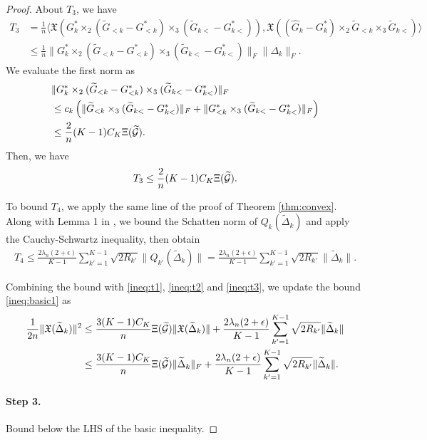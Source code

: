 \begin{proof}
About $T_3$, we have
\begin{align*}
	T_3 &=  \frac{1}{n} \langle  \mathfrak{X}(G_k^* \times_2 (\tilde{G}_{<k} - G_{<k}^*)\times_3 (\tilde{G}_{k<} - G_{k<}^*)), \mathfrak{X}((\hat{G}_k - G_k^*) \times_2 \tilde{G}_{<k} \times_3 \tilde{G}_{k<}) \rangle \\
	&\leq  \frac{1}{n} \|G_k^* \times_2 (\tilde{G}_{<k} - G_{<k}^*)\times_3 (\tilde{G}_{k<} - G_{k<}^*)\|_F \|\Delta_k\|_F.
\end{align*}
We evaluate the first norm as
\begin{align*}
	&\|G_k^* \times_2 (\widetilde{G}_{<k} - G_{<k}^*)\times_3 (\widetilde{G}_{k<} - G_{k<}^*)\|_F \\
	&\leq c_k \left( \|\widetilde{G}_{<k}\times_3 (\widetilde{G}_{k<} - G_{k<}^*)\|_F + \|{G}_{<k}^*\times_3 (\widetilde{G}_{k<} - G_{k<}^*)\|_F \right) \\
	& \leq \frac{2}{n} (K-1) C_K \Xi(\widetilde{\mathcal{G}}).
\end{align*}
Then, we have
\begin{align}
	T_3 \leq \frac{2}{n}(K-1)C_K\Xi(\widetilde{\mathcal{G}}). \label{ineq:t3}
\end{align}



To bound $T_4$, we apply the same line of the proof of Theorem \ref{thm:convex}.
Along with Lemma 1 in \cite{negahban2011estimation}, we bound the Schatten norm of $Q_k(\tilde{\Delta}_k)$ and apply the Cauchy-Schwartz inequality, then obtain
\begin{align*}
	T_4 \leq \frac{2 \lambda_n (2+\epsilon)}{K-1} \sum_{k'=1}^{K-1} \sqrt{2R_{k'}}  \|Q_{k'}(\tilde{\Delta}_{k})\| =  \frac{2 \lambda_n (2+\epsilon)}{K-1}\sum_{k'=1}^{K-1} \sqrt{2R_{k'}}  \|\tilde{\Delta}_{k}\|.
\end{align*}

Combining the bound with \eqref{ineq:t1}, \eqref{ineq:t2} and \eqref{ineq:t3}, we update the bound \eqref{ineq:basic1} as
\begin{align}
	\frac{1}{2n} \| \mathfrak{X}(\widetilde{\Delta}_k)\|^2 &\leq \frac{3(K-1)C_K}{n}\Xi(\widetilde{\mathcal{G}}) \|\mathfrak{X}(\widetilde{\Delta}_k)\| + \frac{2 \lambda_n (2+\epsilon)}{K-1}\sum_{k'=1}^{K-1} \sqrt{2R_{k'}}  \|\widetilde{\Delta}_k\| \notag \\
	& \leq \frac{3(K-1)C_K}{n}\Xi(\widetilde{\mathcal{G}}) \|\widetilde{\Delta}_k\|_F + \frac{2 \lambda_n (2+\epsilon)}{K-1}\sum_{k'=1}^{K-1} \sqrt{2R_{k'}}  \|\widetilde{\Delta}_k\|  . \label{ineq:basic2}
\end{align}


\paragraph{Step 3.} Bound below the LHS of the basic inequality.




\end{proof}
